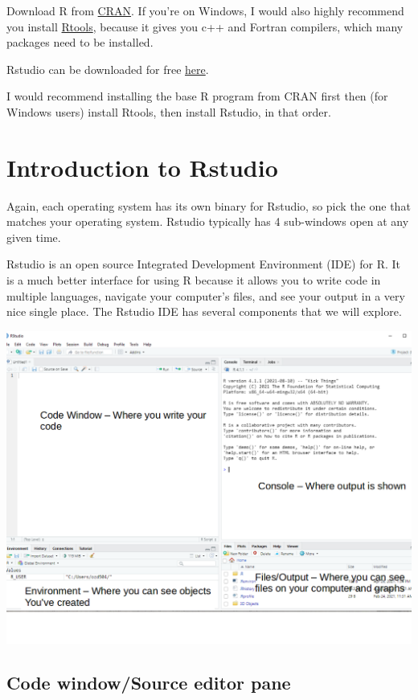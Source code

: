 \documentclass[
  letterpaper,
  DIV=11,
  numbers=noendperiod]{scrreprt}
\begin{document}
Download R from \href{https://cran.r-project.org/}{CRAN}. If you're on
Windows, I would also highly recommend you install
\href{https://cran.r-project.org/}{Rtools}, because it gives you c++ and
Fortran compilers, which many packages need to be installed.

Rstudio can be downloaded for free
\href{https://rstudio.com/products/rstudio/download/}{here}.

I would recommend installing the base R program from CRAN first then
(for Windows users) install Rtools, then install Rstudio, in that order.

\hypertarget{introduction-to-rstudio}{%
\section{Introduction to Rstudio}\label{introduction-to-rstudio}}

Again, each operating system has its own binary for Rstudio, so pick the
one that matches your operating system. Rstudio typically has 4
sub-windows open at any given time.

Rstudio is an open source Integrated Development Environment (IDE) for
R. It is a much better interface for using R because it allows you to
write code in multiple languages, navigate your computer's files, and
see your output in a very nice single place. The Rstudio IDE has several
components that we will explore.

\includegraphics{images/rstudio.png}

\hypertarget{code-windowsource-editor-pane}{%
\subsection{Code window/Source editor
pane}\label{code-windowsource-editor-pane}}
\end{document}
